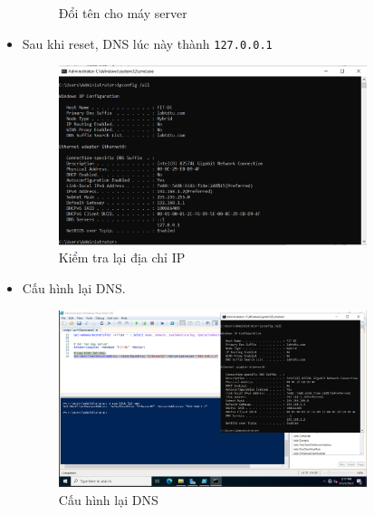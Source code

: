 \documentclass[13pt]{report}
\begin{document}
\begin{itemize}
\begin{figure}[htp]
			\caption{Đổi tên cho máy server}
		\end{figure}
		\newpage
		\item Sau khi reset, DNS lúc này thành \texttt{127.0.0.1}
		\begin{figure}[htp]
			\centering
			\includegraphics[width=0.85\textwidth]{image/PowerShell/ADDC/7.png}
			\caption{Kiểm tra lại địa chỉ IP}
		\end{figure}
		\item Cấu hình lại DNS.
		\begin{figure}[htp]
			\centering
			\includegraphics[width=0.85\textwidth]{image/PowerShell/ADDC/8.png}
			\caption{Cấu hình lại DNS}
		\end{figure}
		\newpage
	\end{itemize}
\end{document}

